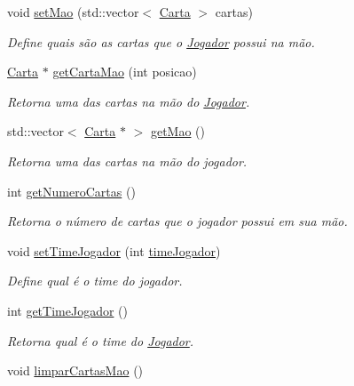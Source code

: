 \begin{DoxyCompactItemize}
void \mbox{\hyperlink{class_jogador_aa4efb1bca8f98a41f38397f8a2d34107}{set\+Mao}} (std\+::vector$<$ \mbox{\hyperlink{class_carta}{Carta}} $>$ cartas)
\begin{DoxyCompactList}\small\item\em Define quais são as cartas que o \mbox{\hyperlink{class_jogador}{Jogador}} possui na mão. \end{DoxyCompactList}\item 
\mbox{\hyperlink{class_carta}{Carta}} $\ast$ \mbox{\hyperlink{class_jogador_a5b275f62c069fced9f4e2bb4f575c8c4}{get\+Carta\+Mao}} (int posicao)
\begin{DoxyCompactList}\small\item\em Retorna uma das cartas na mão do \mbox{\hyperlink{class_jogador}{Jogador}}. \end{DoxyCompactList}\item 
std\+::vector$<$ \mbox{\hyperlink{class_carta}{Carta}} $\ast$ $>$ \mbox{\hyperlink{class_jogador_a653a6a493cce26a6ad32b9fefef8a47c}{get\+Mao}} ()
\begin{DoxyCompactList}\small\item\em Retorna uma das cartas na mão do jogador. \end{DoxyCompactList}\item 
int \mbox{\hyperlink{class_jogador_acb6af0751dae0c4598c6917e3a3eec0c}{get\+Numero\+Cartas}} ()
\begin{DoxyCompactList}\small\item\em Retorna o número de cartas que o jogador possui em sua mão. \end{DoxyCompactList}\item 
void \mbox{\hyperlink{class_jogador_a938aa676a62494ce8b0eff5698fcf7eb}{set\+Time\+Jogador}} (int \mbox{\hyperlink{class_jogador_a799f588b8a5c2504c6a290e617983808}{time\+Jogador}})
\begin{DoxyCompactList}\small\item\em Define qual é o time do jogador. \end{DoxyCompactList}\item 
int \mbox{\hyperlink{class_jogador_a6445980bae531aaca239735557140ffa}{get\+Time\+Jogador}} ()
\begin{DoxyCompactList}\small\item\em Retorna qual é o time do \mbox{\hyperlink{class_jogador}{Jogador}}. \end{DoxyCompactList}\item 
void \mbox{\hyperlink{class_jogador_ae9be28c426f205bb1496d38324befc62}{limpar\+Cartas\+Mao}} ()

\end{DoxyCompactItemize}
